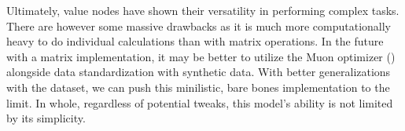 Ultimately, value nodes have shown their versatility in performing complex tasks.
There are however some massive drawbacks as it is much more computationally 
heavy to do individual calculations than with matrix operations. In the future 
with a matrix implementation, it may be better to utilize the Muon optimizer (\cite{jordan2024muon})
alongside data standardization with synthetic data. With better generalizations with the dataset, 
we can push this minilistic, bare bones implementation to the limit. In whole, regardless of potential tweaks, 
this model's ability is not limited by its simplicity.
